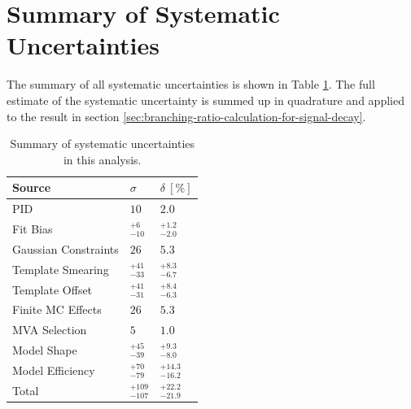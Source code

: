 \section{Summary of Systematic Uncertainties}

The summary of all systematic uncertainties is shown in Table \ref{tab:sys_summary}. The full estimate of the systematic uncertainty is summed up in quadrature and applied to the result in section \ref{sec:branching-ratio-calculation-for-signal-decay}.


\begin{table}[H]
	\centering
	\begin{tabular}{l|l|l}
		Source & $\sigma$ & $\delta~[\%]$ \\
		\toprule
		PID & $10$ & $2.0$ \\
		Fit Bias & $ {}^{+6}_{-10}$ & ${}^{+1.2}_{-2.0}$ \\
		Gaussian Constraints & $26$ & $5.3$ \\
		Template Smearing & ${}^{+41}_{-33}$ & ${}^{+8.3}_{-6.7}$ \\
		Template Offset & ${}^{+41}_{-31}$ & ${}^{+8.4}_{-6.3}$ \\
		Finite MC Effects & $26$ & $5.3$ \\
		MVA Selection & $5$ & $1.0$\\
		Model Shape & ${}^{+45}_{-39}$ & ${}^{+9.3}_{-8.0}$ \\
		Model Efficiency & ${}^{+70}_{-79}$ & ${}^{+14.3}_{-16.2}$ \\
		\midrule
		Total & ${} ^{+109}_{-107}$ & ${}^{+22.2}_{-21.9}$ \\
		\bottomrule
	\end{tabular}
	\captionsetup{width=0.8\linewidth}
	\caption{Summary of systematic uncertainties in this analysis.}
	\label{tab:sys_summary}
\end{table}








